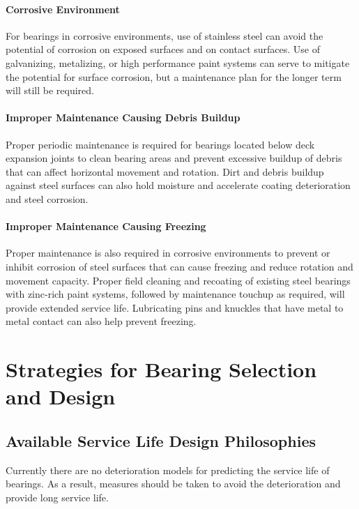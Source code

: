 \paragraph{Corrosive Environment}
For bearings in corrosive environments, use of stainless steel can avoid the potential of corrosion on exposed
surfaces and on contact surfaces. Use of galvanizing, metalizing, or high performance paint systems can serve to
mitigate the potential for surface corrosion, but a maintenance plan for the longer term will still be required.

\paragraph{Improper Maintenance Causing Debris Buildup}
Proper periodic maintenance is required for bearings located below deck expansion joints to clean bearing areas
and prevent excessive buildup of debris that can affect horizontal movement and rotation. Dirt and debris buildup
against steel surfaces can also hold moisture and accelerate coating deterioration and steel corrosion.

\paragraph{Improper Maintenance Causing Freezing}
Proper maintenance is also required in corrosive environments to prevent or inhibit corrosion of steel surfaces
that can cause freezing and reduce rotation and movement capacity. Proper field cleaning and recoating of existing
steel bearings with zinc-rich paint systems, followed by maintenance touchup as required, will provide extended
service life. Lubricating pins and knuckles that have metal to metal contact can also help prevent freezing.

\section{Strategies for Bearing Selection and Design}
\subsection{Available Service Life Design Philosophies}
Currently there are no deterioration models for predicting the service life of bearings. As a result, measures
should be taken to avoid the deterioration and provide long service life.

